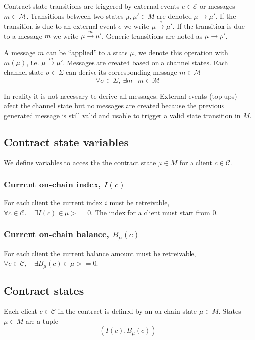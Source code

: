 \documentclass{llncs}
\begin{document}
Contract state transitions are triggered by external events $e \in \mathcal{E}$ or messages $m \in \mathcal{M}$. Transitions between two states $\mu, \mu' \in M$ are denoted $\mu \rightarrow \mu '$. If the transition is due to an external event $e$ we write $\mu \xrightarrow{e} \mu '$. If the transition is due to a message $m$ we write $\mu \xrightarrow{m} \mu '$. Generic transitions are noted as $\mu \rightarrow \mu '$.

A message $m$ can be ``applied'' to a state $\mu$, we denote this operation with $m(\mu)$, i.e. $\mu \xrightarrow{m} \mu'$. Messages are created based on a channel states. Each channel state $\sigma \in \Sigma$ can derive its corresponding message $m \in \mathcal{M}$
$$\forall \sigma \in \Sigma,\ \exists m\ |\ m \in \mathcal{M}$$

In reality it is not necessary to derive all messages. External events (top ups) afect the channel state but no messages are created because the previous generated message is still valid and usable to trigger a valid state transition in $M$.

\subsection{Contract state variables} We define variables to acces the the contract state $\mu \in M$ for a client $c \in \mathcal{C}$.

\subsubsection{Current on-chain index, $I(c)$} For each client the current index $i$ must be retreivable, $\forall c \in \mathcal{C}, \quad \exists I(c) \in \mu >= 0$. The index for a client must start from $0$.

\subsubsection{Current on-chain balance, $B_\mu(c)$} For each client the current balance amount must be retreivable, $\forall c \in \mathcal{C}, \quad \exists B_\mu(c) \in \mu >= 0$.

\subsection{Contract states} Each client $c \in \mathcal{C}$ in the contract is defined by an on-chain state $\mu \in M$. States $\mu \in M$ are a tuple
$$(I(c), B_\mu(c))$$
\end{document}
